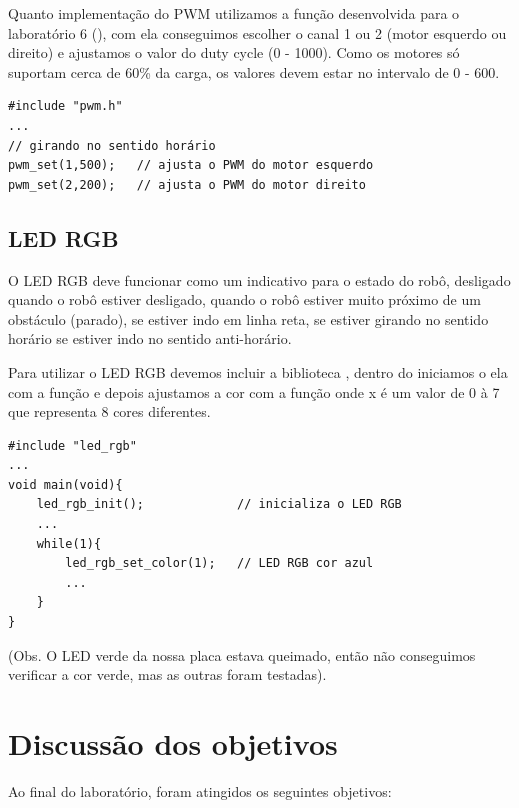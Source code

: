 \documentclass{article}
\begin{document}
Quanto implementação do PWM utilizamos a função  desenvolvida para o laboratório 6 (), com ela conseguimos escolher o canal 1 ou 2 (motor esquerdo ou direito) e ajustamos o valor do duty cycle (0 - 1000). Como os motores só suportam cerca de 60\% da carga, os valores devem estar no intervalo de 0 - 600.

\begin{lstlisting}[style = Matlab-editor, language = C2]
#include "pwm.h"
...
// girando no sentido horário
pwm_set(1,500);   // ajusta o PWM do motor esquerdo
pwm_set(2,200);   // ajusta o PWM do motor direito
\end{lstlisting}



\subsection{LED RGB}

O LED RGB deve funcionar como um indicativo para o estado do robô, desligado quando o robô estiver desligado,  quando o robô estiver muito próximo de um obstáculo (parado),  se estiver indo em linha reta,  se estiver girando no sentido horário  se estiver indo no sentido anti-horário.\par

Para utilizar o LED RGB devemos incluir a biblioteca , dentro do  iniciamos o ela com a função  e depois ajustamos a cor com a função  onde x é um valor de 0 à 7 que representa 8 cores diferentes.  

\begin{lstlisting}[style = Matlab-editor, language = C2]
#include "led_rgb"
...
void main(void){
    led_rgb_init();             // inicializa o LED RGB
    ...
    while(1){
        led_rgb_set_color(1);   // LED RGB cor azul
        ...
    }
}
\end{lstlisting}

(Obs. O LED verde da nossa placa estava queimado, então não conseguimos verificar a cor verde, mas as outras foram testadas).
\section{Discussão dos objetivos}
Ao final do laboratório, foram atingidos os seguintes objetivos: 
\end{document}
